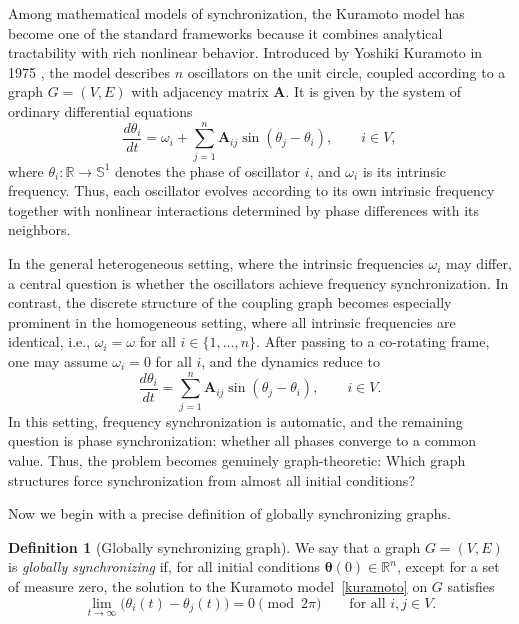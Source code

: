 \documentclass[11pt,reqno]{amsart}
\theoremstyle{definition}
\newtheorem{definition}[theorem]{Definition}
\begin{document}
Among mathematical models of synchronization, the Kuramoto model has become one of the standard frameworks because it combines analytical tractability with rich nonlinear behavior. Introduced by Yoshiki Kuramoto in 1975 \cite{Kuramoto1975}, the model describes \(n\) oscillators on the unit circle, coupled according to a graph \(G=(V,E)\) with adjacency matrix \(\boldsymbol{A}\). It is given by the system of ordinary differential equations
\[
 \frac{d\theta_i}{dt}
 =
 \omega_i
 +
 \sum_{j=1}^{n} \boldsymbol{A}_{ij}\sin(\theta_j-\theta_i),
 \qquad i\in V,
\]
where \(\theta_i:\mathbb{R}\to\mathbb{S}^1\) denotes the phase of oscillator \(i\), and \(\omega_i\) is its intrinsic frequency. Thus, each oscillator evolves according to its own intrinsic frequency together with nonlinear interactions determined by phase differences with its neighbors.

In the general heterogeneous setting, where the intrinsic frequencies \(\omega_i\) may differ, a central question is whether the oscillators achieve frequency synchronization. In contrast, the discrete structure of the coupling graph becomes especially prominent in the homogeneous setting, where all intrinsic frequencies are identical, i.e.,
\(\omega_i=\omega\) for all \(i\in\{1,\ldots,n\}\).
After passing to a co-rotating frame, one may assume \(\omega_i=0\) for all \(i\), and the dynamics reduce to
\begin{equation}\label{kuramoto}
 \frac{d\theta_i}{dt}
 =
 \sum_{j=1}^{n} \boldsymbol{A}_{ij}\sin(\theta_j-\theta_i),
 \qquad i\in V.
\end{equation}
In this setting, frequency synchronization is automatic, and the remaining question is phase synchronization: whether all phases converge to a common value. Thus, the problem becomes genuinely graph-theoretic: Which graph structures force synchronization from almost all initial conditions?
\medskip

Now we begin with a precise definition of globally synchronizing graphs.

\begin{definition}[Globally synchronizing graph]\label{defi-globalsync}
We say that a graph \(G=(V,E)\) is \emph{globally synchronizing} if,
for all initial conditions \(\boldsymbol{\theta}(0)\in\mathbb{R}^n\),
except for a set of measure zero,
the solution to the Kuramoto model~\eqref{kuramoto} on $G$ satisfies
\[
\lim_{t\to\infty} \bigl(\theta_i(t)-\theta_j(t)\bigr)=0
\pmod{2\pi}
\qquad \text{for all } i,j\in V.
\]
\end{definition}
\end{document}
